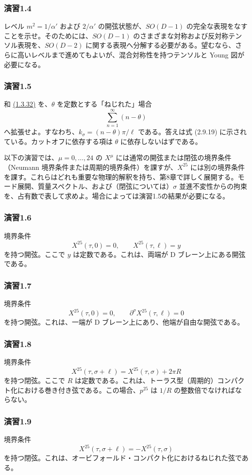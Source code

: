 \medskip
\subsubsection*{演習1.4}\label{ex:1.4}
レベル $m^2=1/\alpha'$ および $2/\alpha'$ の開弦状態が、$SO(D-1)$ の完全な表現をなすことを示せ。そのためには、$SO(D-1)$ のさまざまな対称および反対称テンソル表現を、$SO(D-2)$ に関する表現へ分解する必要がある。望むなら、さらに高いレベルまで進めてもよいが、混合対称性を持つテンソルと Young 図が必要になる。

\medskip
\subsubsection*{演習1.5}\label{ex:1.5}
和 \hyperref[eq:1.3.32]{(1.3.32)} を、$\theta$ を定数とする「ねじれた」場合
\[
\sum_{n=1}^\infty(n-\theta)
\]
へ拡張せよ。すなわち、$k_\sigma=(n-\theta)\pi/\ell$ である。答えは式 (2.9.19) に示されている。カットオフに依存する項は $\theta$ に依存しないはずである。

以下の演習では、$\mu=0,\ldots,24$ の $X^\mu$ には通常の開弦または閉弦の境界条件（Neumann 境界条件または周期的境界条件）を課すが、$X^{25}$ には別の境界条件を課す。これらはどれも重要な物理的解釈を持ち、第8章で詳しく展開する。モード展開、質量スペクトル、および（閉弦については）$\sigma$ 並進不変性からの拘束を、占有数で表して求めよ。場合によっては演習1.5の結果が必要になる。

\medskip
\subsubsection*{演習1.6}\label{ex:1.6}
境界条件
\[
X^{25}(\tau,0)=0,\qquad X^{25}(\tau,\ell)=y
\]
を持つ開弦。ここで $y$ は定数である。これは、両端が D ブレーン上にある開弦である。

\medskip
\subsubsection*{演習1.7}\label{ex:1.7}
境界条件
\[
X^{25}(\tau,0)=0,\qquad \partial^\sigma X^{25}(\tau,\ell)=0
\]
を持つ開弦。これは、一端が D ブレーン上にあり、他端が自由な開弦である。

\medskip
\subsubsection*{演習1.8}\label{ex:1.8}
境界条件
\[
X^{25}(\tau,\sigma+\ell)=X^{25}(\tau,\sigma)+2\pi R
\]
を持つ閉弦。ここで $R$ は定数である。これは、トーラス型（周期的）コンパクト化における巻き付き弦である。この場合、$p^{25}$ は $1/R$ の整数倍でなければならない。

\medskip
\subsubsection*{演習1.9}\label{ex:1.9}
境界条件
\[
X^{25}(\tau,\sigma+\ell)=-X^{25}(\tau,\sigma)
\]
を持つ閉弦。これは、オービフォールド・コンパクト化におけるねじれた弦である。
